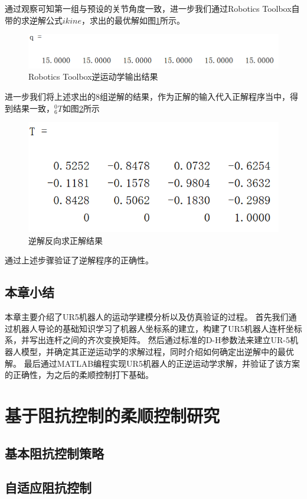 \documentclass{seuthesis-2022}
\numberwithin{equation}{section}
\begin{document}
通过观察可知第一组与预设的关节角度一致，进一步我们通过Robotics Toolbox自带的求逆解公式$ikine$，求出的最优解如图\ref{fig:Robotics Toolbox逆运动学输出结果}所示。
\begin{figure}[H]
  \centering
  \includegraphics[width=0.7\linewidth]{fig/Robotics Toolbox逆运动学输出结果.png}
  \caption{Robotics Toolbox逆运动学输出结果}
  \label{fig:Robotics Toolbox逆运动学输出结果}
\end{figure}

进一步我们将上述求出的8组逆解的结果，作为正解的输入代入正解程序当中，得到结果一致，$^0_6T$如图\ref{fig:逆解反代}所示
\begin{figure}[H]
  \centering
  \includegraphics[width=0.5\linewidth]{fig/逆解反代结果.png}
  \caption{逆解反向求正解结果}
  \label{fig:逆解反代}
\end{figure}

通过上述步骤验证了逆解程序的正确性。

\section{本章小结}
本章主要介绍了UR5机器人的运动学建模分析以及仿真验证的过程。
首先我们通过机器人导论的基础知识学习了机器人坐标系的建立，构建了UR5机器人连杆坐标系，并写出连杆之间的齐次变换矩阵。
然后通过标准的D-H参数法来建立UR-5机器人模型，并确定其正逆运动学的求解过程，同时介绍如何确定出逆解中的最优解。
最后通过MATLAB编程实现UR5机器人的正逆运动学求解，并验证了该方案的正确性，为之后的柔顺控制打下基础。

\chapter{基于阻抗控制的柔顺控制研究}

\section{基本阻抗控制策略}

\section{自适应阻抗控制}
\end{document}
